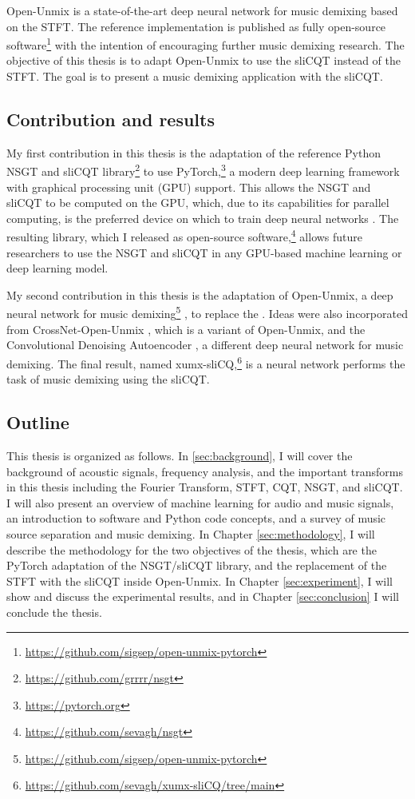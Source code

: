 \documentclass[report.tex]{subfiles}
\begin{document}
Open-Unmix \parencite{umx} is a state-of-the-art deep neural network for music demixing based on the STFT. The reference implementation is published as fully open-source software\footnote{\url{https://github.com/sigsep/open-unmix-pytorch}} with the intention of encouraging further music demixing research. The objective of this thesis is to adapt Open-Unmix to use the sliCQT instead of the STFT. The goal is to present a  music demixing  application with the sliCQT.

\subsection{Contribution and results}

My first contribution in this thesis is the adaptation of the reference Python NSGT and sliCQT library\footnote{\url{https://github.com/grrrr/nsgt}} to use PyTorch,\footnote{\url{https://pytorch.org}} a modern deep learning framework with graphical processing unit (GPU) support. This allows the NSGT and sliCQT to be computed on the GPU, which, due to its capabilities for parallel computing, is the preferred device on which to train deep neural networks \parencite{pytorch}. The resulting library, which I released as open-source software,\footnote{\url{https://github.com/sevagh/nsgt}} allows future researchers to use the NSGT and sliCQT in any GPU-based machine learning or deep learning model.

My second contribution in this thesis is the adaptation of Open-Unmix, a deep neural network for music demixing\footnote{\url{https://github.com/sigsep/open-unmix-pytorch}} \parencite{umx}, to replace the . Ideas were also incorporated from CrossNet-Open-Unmix \parencite{xumx}, which is a variant of Open-Unmix, and the Convolutional Denoising Autoencoder \parencite{plumbley1}, a different deep neural network for music demixing. The final result, named xumx-sliCQ,\footnote{\url{https://github.com/sevagh/xumx-sliCQ/tree/main}} is a neural network  performs the task of music demixing using the sliCQT.

\subsection{Outline}

This thesis is organized as follows. In  \ref{sec:background}, I will cover the background of acoustic signals, frequency analysis, and the important transforms in this thesis including the Fourier Transform, STFT, CQT, NSGT, and sliCQT. I will also present an overview of machine learning for audio and music signals, an introduction to software and Python code concepts, and a survey of music source separation and music demixing. In Chapter \ref{sec:methodology}, I will describe the methodology for the two objectives of the thesis, which are the PyTorch adaptation of the NSGT/sliCQT library, and the replacement of the STFT with the sliCQT inside Open-Unmix. In Chapter \ref{sec:experiment}, I will show and discuss the experimental results, and in Chapter \ref{sec:conclusion} I will conclude the thesis.
\end{document}
